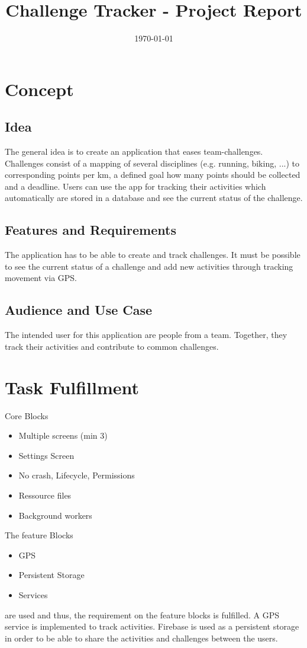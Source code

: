 \documentclass{article}
\author{}
\date{\today}
\title{Challenge Tracker - Project Report}
\begin{document}
	\maketitle
	\section{Concept}
	\subsection{Idea}
	The general idea is to create an application that eases team-challenges. Challenges consist of a mapping of several disciplines (e.g. running, biking, ...) to corresponding points per km, a defined goal how many points should be collected and a deadline. Users can use the app for tracking their activities which automatically are stored in a database and see the current status of the challenge.
	\subsection{Features and Requirements}
	\label{sec:req}
	The application has to be able to create and track challenges. It must be possible to see the current status of a challenge and add new activities through tracking movement via GPS.
	\subsection{Audience and Use Case}
	The intended user for this application are people from a team. Together, they track their activities and contribute to common challenges. 
	
	\section{Task Fulfillment}
	Core Blocks
	\begin{itemize}
		\item Multiple screens (min 3)
		\item Settings Screen
		\item No crash, Lifecycle, Permissions
		\item Ressource files
		\item Background workers
	\end{itemize}
	
	The feature Blocks
	\begin{itemize}
		\item GPS
		\item Persistent Storage
		\item Services
	\end{itemize}
	are used and thus, the requirement on the feature blocks is fulfilled. A GPS service is implemented to track activities. Firebase is used as a persistent storage in order to be able to share the activities and challenges between the users. 
	
\end{document}
